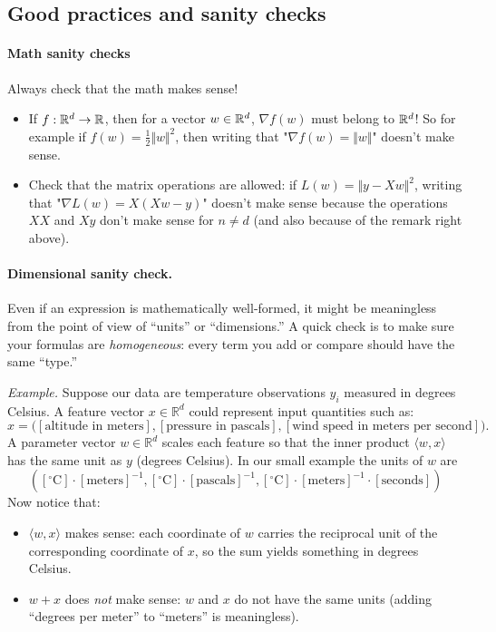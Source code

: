 \subsection{Good practices and sanity checks}

\paragraph{Math sanity checks} Always check that the math makes sense! 

\begin{itemize}
    \item  If $f : \mathbb{R}^d \to \mathbb{R}$, then for a vector $w \in \mathbb{R}^d$, $\nabla f(w)$ must belong to $\mathbb{R}^d$! So for example if $f(w) = \frac{1}{2} \Vert w \Vert^2$, then writing that "$\nabla f(w) = \Vert w \Vert$" doesn't make sense. 
    \item Check that the matrix operations are allowed: if $L(w) = \Vert y - X w \Vert^2$, writing that "$\nabla L(w) = X (X w -y)$" doesn't make sense because the operations $X X$ and $X y$ don't make sense for $n \neq d$ (and also because of the remark right above).
\end{itemize}


\paragraph{Dimensional sanity check.}  
Even if an expression is mathematically well-formed, it might be meaningless from the point of view of ``units'' or ``dimensions.''  
A quick check is to make sure your formulas are \emph{homogeneous}: every term you add or compare should have the same ``type.'' 
 
\noindent
\textit{Example.} Suppose our data are temperature observations $y_i$ measured in degrees Celsius. A feature vector $x \in \mathbb{R}^d$ could represent input quantities such as:
\[
x = \big([\text{altitude in meters}], [\text{pressure in pascals}], [\text{wind speed in meters per second}] \big).
\]
A parameter vector $w \in \mathbb{R}^d$ scales each feature so that the inner product $\langle w, x \rangle$
has the same unit as $y$ (degrees Celsius). In our small example the units of $w$ are 
\[ ([^\circ\mathrm{C}] \cdot [\text{meters}]^{-1}, [^\circ\mathrm{C}] \cdot [\text{pascals}]^{-1}, [^\circ\mathrm{C}] \cdot [\text{meters}]^{-1} \cdot [\text{seconds}]) \]
Now notice that:
\begin{itemize}
    \item $\langle w, x \rangle$ makes sense: each coordinate of $w$ carries the reciprocal unit of the corresponding coordinate of $x$, so the sum yields something in degrees Celsius.  
    \item $w + x$ does \emph{not} make sense: $w$ and $x$ do not have the same units (adding ``degrees per meter'' to ``meters'' is meaningless).  
\end{itemize}


